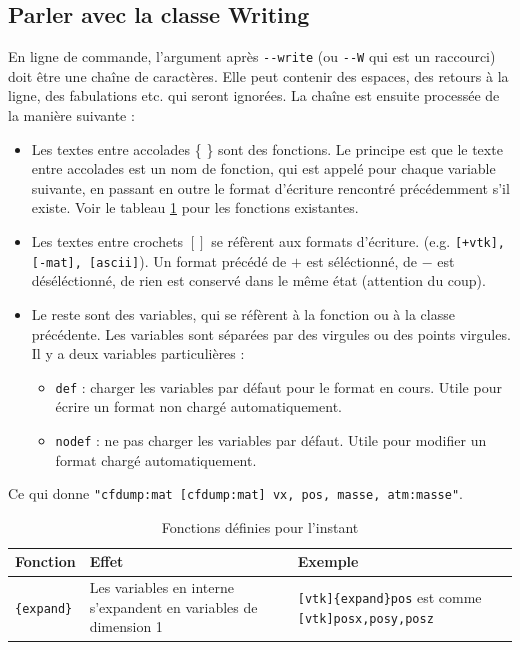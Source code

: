 \documentclass[a4paper,12pt]{article}
\begin{document}
{{{\subsection{Parler avec la classe Writing}
En ligne de commande, l'argument apr\`es \verb+--write+ (ou \verb+--W+ qui est un raccourci) doit \^etre une cha\^ine de caract\`eres. Elle peut contenir des espaces, des retours \`a la ligne, des fabulations etc. qui seront ignor\'ees. La cha\^ine est ensuite process\'ee de la mani\`ere suivante : 
\begin{itemize}
\item Les textes entre accolades \{ \} sont des fonctions. Le principe est que le texte entre accolades est un nom de fonction, qui est appel\'e pour chaque variable suivante, en passant en outre le format d'\'ecriture rencontr\'e pr\'ec\'edemment s'il existe. Voir le tableau \ref{Writing_fonctions} pour les fonctions existantes.
\item Les textes entre crochets $\left [ \right ] $ se r\'ef\`erent aux formats d'\'ecriture. (e.g. \texttt{[+vtk], [-mat], [ascii]}). Un format pr\'ec\'ed\'e de $+$ est s\'el\'ectionn\'e, de $-$ est d\'es\'el\'ectionn\'e, de rien est conserv\'e dans le m\^eme \'etat (attention du coup). 
\item Le reste sont des variables, qui se r\'ef\`erent \`a la fonction ou \`a la classe pr\'ec\'edente. Les variables sont s\'epar\'ees par des virgules ou des points virgules. Il y a deux variables particuli\`eres : \begin{itemize}
\item \texttt{def} : charger les variables par d\'efaut pour le format en cours. Utile pour \'ecrire un format non charg\'e automatiquement.
\item \texttt{nodef} : ne pas charger les variables par d\'efaut. Utile pour modifier un format charg\'e automatiquement.
\end{itemize}\end{itemize}
Ce qui donne \texttt{"cfdump:mat [cfdump:mat] vx, pos, masse, atm:masse"}.

\begin{table}
\begin{tabular}{l|p{5cm}|p{5cm}}
Fonction & Effet & Exemple \\ \hline
\verb+{expand}+ & Les variables en interne s'expandent en variables de dimension 1 & \verb+[vtk]{expand}pos+ est comme \verb+[vtk]posx,posy,posz+
\end{tabular}
\caption{Fonctions d\'efinies pour l'instant}
\label{Writing_fonctions}
\end{table}

}}}
\end{document}
